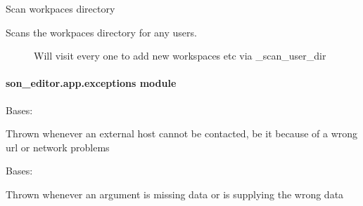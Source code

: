 \documentclass[letterpaper,10pt,english]{sphinxmanual}
\begin{document}

\begin{fulllineitems}
\label{_source/son_editor.app:son_editor.app.database.scan_workspaces_dir}
Scan workpaces directory
\begin{description}
\item[{Scans the workpaces directory for any users.}] \leavevmode
Will visit every one to add new workspaces etc via \_scan\_user\_dir

\end{description}

\end{fulllineitems}



\paragraph{son\_editor.app.exceptions module}
\label{_source/son_editor.app:module-son_editor.app.exceptions}\label{_source/son_editor.app:son-editor-app-exceptions-module}

\begin{fulllineitems}
\label{_source/son_editor.app:son_editor.app.exceptions.ExtNotReachable}
Bases: 

Thrown whenever an external host cannot be contacted, be it because of a wrong url or network problems

\end{fulllineitems}


\begin{fulllineitems}
\label{_source/son_editor.app:son_editor.app.exceptions.InvalidArgument}
Bases: 

Thrown whenever an argument is missing data or is supplying the wrong data

\end{fulllineitems}

\end{document}
